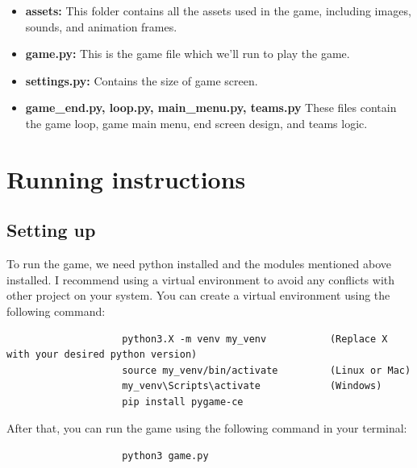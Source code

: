 \documentclass[10pt]{article}
\begin{document}
\vspace{1cm}

\begin{itemize}
    \item \textbf{assets:} This folder contains all the assets used in the game, including images, sounds, and animation frames.
    \item \textbf{game.py:} This is the game file which we'll run to play the game.
    \item \textbf{settings.py:} Contains the size of game screen.
    \item \textbf{game\_end.py, loop.py, main\_menu.py, teams.py} These files contain the game loop, game main menu, end screen design, and teams logic.
\end{itemize}

\vspace{1cm}
\section{Running instructions}\label{sec:Running-instructions}


\subsection{Setting up}\label{subsec:Setting-up}
To run the game, we need python installed and the modules mentioned above installed. I recommend using a virtual environment to avoid any conflicts with other project on your system. You can create a virtual environment using the following command:
\begin{verbatim}
                    python3.X -m venv my_venv           (Replace X with your desired python version)
                    source my_venv/bin/activate         (Linux or Mac)
                    my_venv\Scripts\activate            (Windows)
                    pip install pygame-ce
                \end{verbatim}
After that, you can run the game using the following command in your terminal:
\begin{verbatim}
                    python3 game.py
                \end{verbatim}
\end{document}
